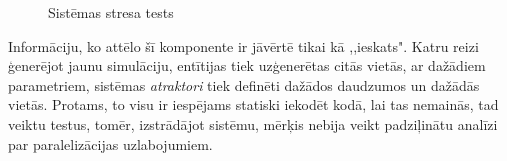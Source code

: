 \begin{figure}[H]%
    \centering
    \qquad
    \caption{Sistēmas stresa tests}
    \label{img:test-single-vs-mutlicore}%
\end{figure}

Informāciju, ko attēlo šī komponente ir jāvērtē tikai kā ,,ieskats". Katru
reizi ģenerējot jaunu simulāciju, entītijas tiek uzģenerētas citās vietās, ar
dažādiem parametriem, sistēmas \emph{atraktori} tiek definēti dažādos daudzumos
un dažādās vietās.
Protams, to visu ir iespējams statiski iekodēt kodā, lai tas nemainās, tad veiktu
testus, tomēr,
izstrādājot sistēmu, mērķis nebija veikt padziļinātu analīzi par paralelizācijas
uzlabojumiem.
